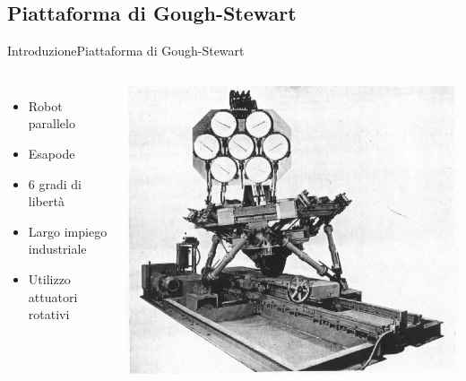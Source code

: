 \documentclass[10pt,aspectratio=169
	]{beamer}
\begin{document}
	\subsection{Piattaforma di Gough-Stewart}
	\begin{frame}{Introduzione}{Piattaforma di Gough-Stewart}

	\begin{columns}
	
	\begin{itemize}
		\item Robot parallelo
		\item Esapode
		\item 6 gradi di libertà
		\item Largo impiego industriale
		\item Utilizzo attuatori rotativi
	\end{itemize}
	\centering \includegraphics[width=\textwidth]{./images/gough.png}
	\end{columns}
	\end{frame}
	
\end{document}
